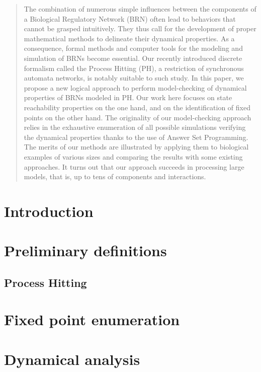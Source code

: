 \documentclass[conference]{IEEEtran}
\begin{document}
\begin{abstract}
The combination of numerous simple influences between the components of a Biological Regulatory Network (BRN)
often lead to behaviors that cannot be grasped intuitively.
They thus call for the development of proper mathematical methods to delineate their dynamical properties.
As a consequence, formal methods and computer tools for the modeling and simulation of BRNs become essential.
Our recently introduced discrete formalism called the Process Hitting (PH), a restriction of synchronous automata networks, is notably suitable to such study.
In this paper, we propose a new logical approach to perform model-checking of dynamical properties of BRNs modeled in PH.
Our work here focuses on state reachability properties on the one hand, and on the identification of fixed points on the other hand.
The originality of our model-checking approach relies in the exhaustive enumeration of all possible simulations verifying the dynamical properties thanks to the use of Answer Set Programming.
The merits of our methods are illustrated by applying them to biological examples of various sizes and comparing the results with some existing approaches.
It turns out that our approach succeeds in processing large models, that is, up to tens of components and interactions.
\end{abstract}

\IEEEpeerreviewmaketitle



\section{Introduction}


\section{Preliminary definitions}
\label{sec:defs}
\subsection{Process Hitting}


\section{Fixed point enumeration}
\label{sec:fixpoint}


\section{Dynamical analysis}
\label{sec:dynamics}

\end{document}
